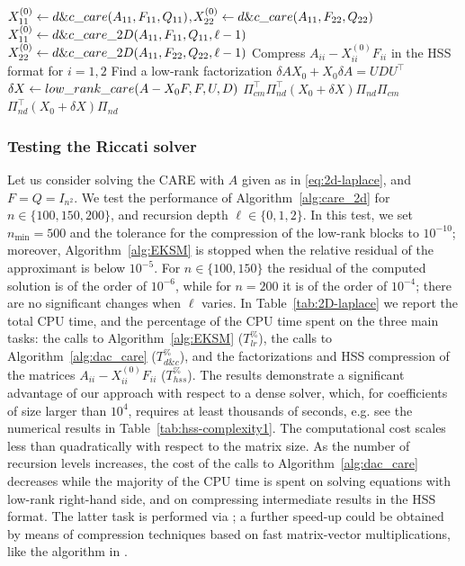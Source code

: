 \documentclass[a4paper,10pt]{article}
\begin{document}
{\begin{algorithm}
\begin{algorithmic}[1]
		 \State$X_{11}^{(0)}\gets\textsc{d\&c\_care}(A_{11},F_{11},Q_{11})$,\quad $X_{22}^{(0)}\gets\textsc{d\&c\_care}(A_{11},F_{22},Q_{22})$  
		\Else
		\State $X_{11}^{(0)}\gets\textsc{d\&c\_care\_2D}(A_{11},F_{11},Q_{11},\ell-1)$
		\State $X_{22}^{(0)}\gets\textsc{d\&c\_care\_2D}(A_{11},F_{22},Q_{22},\ell-1)$ 
		\EndIf
		\State Compress $A_{ii}-X_{ii}^{(0)}F_{ii}$ in the HSS format for $i=1,2$
		\State Find a low-rank factorization $\delta AX_0+X_0\delta A= UDU^\top$
		\State $\delta X\gets\textsc{low\_rank\_care}(A-X_0F,F, U, D)$
		\State \Return $\Pi_{cm}^\top\Pi_{nd}^\top\left( X_0+ \delta X\right)\Pi_{nd}\Pi_{cm}$
		\Else
		\State \Return $\Pi_{nd}^\top\left( X_0+ \delta X\right)\Pi_{nd}$
		\EndIf
		\EndProcedure
	\end{algorithmic}
\end{algorithm}



\subsubsection{Testing the Riccati solver}\label{sec:2d-laplace}
Let us consider solving the CARE with $A$ given as in \eqref{eq:2d-laplace}, and $F=Q=I_{n^2}$. We test the performance of Algorithm~\ref{alg:care_2d} for $n\in\{100,150,200\}$, and recursion depth $\ell\in\{0,1,2\}$. In this test, we set $n_{\min}=500$ and the tolerance for the compression of the low-rank blocks to $10^{-10}$; moreover, Algorithm~\ref{alg:EKSM} is stopped when the relative residual of the approximant is below $10^{-5}$. For $n\in \{100,150\}$ the residual of the computed solution is of the order of $10^{-6}$, while for $n=200$ it is of the order of $10^{-4}$; there are no significant changes when $\ell$ varies. In Table~\ref{tab:2D-laplace} we report the total CPU time, and the percentage of the CPU time spent on the three main tasks: the calls to Algorithm~\ref{alg:EKSM} ($T_{lr}^{\%}$), the calls to Algorithm~\ref{alg:dac_care} ($T_{d\&c}^{\%}$), and the factorizations and HSS compression of the matrices $A_{ii}-X_{ii}^{(0)}F_{ii}$ ($T_{hss}^{\%}$). The results demonstrate a significant advantage of our approach with respect to a dense solver, which, for coefficients of size larger than $10^4$, requires at least thousands of seconds, e.g. see the numerical results in Table~\ref{tab:hss-complexity1}. The computational cost scales less than quadratically with respect to the matrix size. As the number of recursion levels increases, the cost of the calls to Algorithm~\ref{alg:dac_care} decreases while the majority of the CPU time is spent on solving equations with low-rank right-hand side, and on compressing intermediate results in the HSS format. The latter task is performed via \cite[Algorithm 1]{xia10}; a further speed-up could be obtained by means of compression techniques based on fast matrix-vector multiplications, like the algorithm in \cite{levitt2024linear}. 
}
\end{document}
